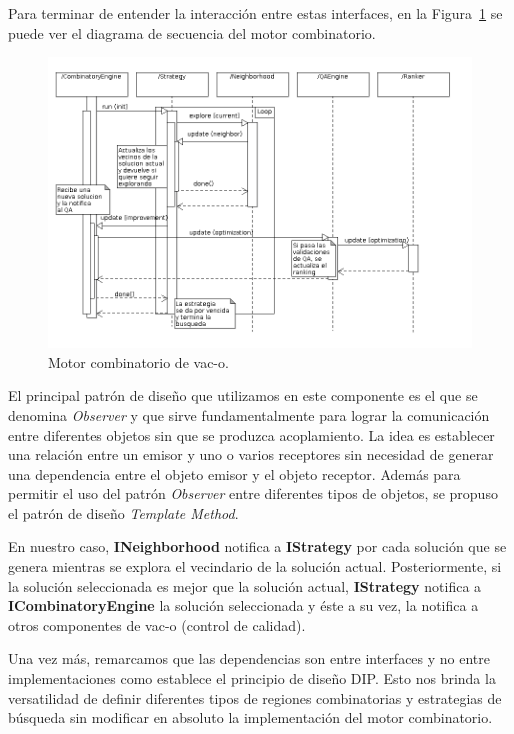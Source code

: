 Para terminar de entender la interacci\'on entre estas interfaces, en la
Figura~\ref{motor} se puede ver el diagrama de secuencia del motor combinatorio.

\begin{figure} 
  \centering
  \includegraphics[scale=0.45]{sequence.png}
  \caption{Motor combinatorio de vac-o.}
\label{motor}
\end{figure}

El principal patr\'on de dise\~no que utilizamos en este componente es el que
se denomina \textit{Observer} y que sirve fundamentalmente para lograr la
comunicaci\'on entre diferentes objetos sin que se produzca acoplamiento. La
idea es establecer una relaci\'on entre un emisor y uno o varios receptores
sin necesidad de generar una dependencia entre el objeto emisor y el objeto
receptor. Adem\'as para permitir el uso del patr\'on \textit{Observer} entre
diferentes tipos de objetos, se propuso el patr\'on de dise\~no \textit{Template
Method}.

En nuestro caso, \textbf{INeighborhood} notifica a \textbf{IStrategy} por cada
soluci\'on que se genera mientras se explora el vecindario de la soluci\'on
actual. Posteriormente, si la soluci\'on seleccionada es mejor que la soluci\'on
actual, \textbf{IStrategy} notifica a \textbf{ICombinatoryEngine} la soluci\'on
seleccionada y \'este a su vez, la notifica a otros componentes de \ac{vac-o}
(control de calidad).

Una vez m\'as, remarcamos que las dependencias son entre interfaces y no entre
implementaciones como establece el principio de dise\~no \ac{DIP}. Esto nos
brinda la versatilidad de definir diferentes tipos de regiones combinatorias y
estrategias de b\'usqueda sin modificar en absoluto la implementaci\'on del
motor combinatorio.